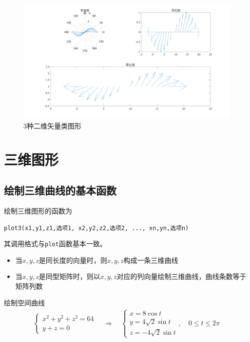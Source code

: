 \vspace*{-1.5em}
\begin{figure}[!htb]
	\centering
	\includegraphics[width=\linewidth]{pic/二维矢量图.pdf}
	\vspace*{-3em}
	\caption{3种二维矢量类图形}
\end{figure}

\section{三维图形}
\subsection{绘制三维曲线的基本函数}
绘制三维图形的函数为
\begin{center}
	\lstinline|plot3(x1,y1,z1,选项1, x2,y2,z2,选项2, ..., xn,yn,选项n)|
\end{center}
其调用格式与\lstinline|plot|函数基本一致。
\begin{itemize}
	\item 当$x,y,z$是同长度的向量时，则$x,y,z$构成一条三维曲线
	\item 当$x,y,z$是同型矩阵时，则以$x,y,z$对应的列向量绘制三维曲线，曲线条数等于矩阵列数
\end{itemize}

\examples 绘制空间曲线
\begin{align*}
	\begin{cases}
		x^2 + y^2 + z^2 = 64\\
		y + z = 0
	\end{cases}
	\quad \Longrightarrow \quad 
	\begin{cases}
		x = 8\cos t\\
		y = 4 \sqrt{2} \sin t\\
		z = - 4 \sqrt{2} \sin t
	\end{cases}
,\quad 0 \le t \le 2\pi
\end{align*}

